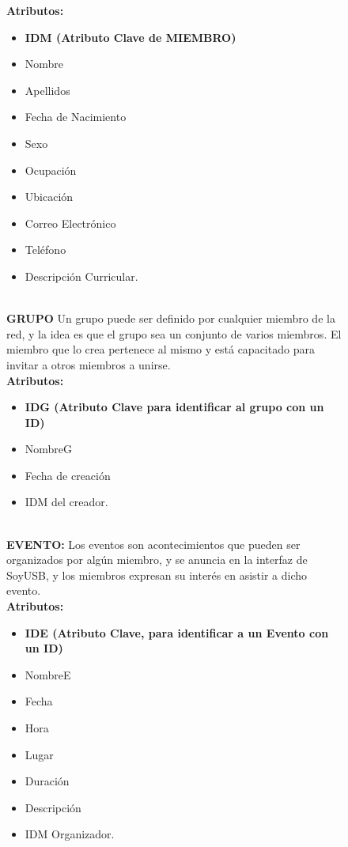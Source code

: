 \documentclass{article}
\begin{document}
\begin{figure}[h]
{\bf{Atributos:}}\\

\newline

\begin{itemize}
 \item {\bf{IDM (Atributo Clave de MIEMBRO)}}
\item Nombre
\item  Apellidos
\item Fecha de Nacimiento
\item Sexo
\item Ocupaci\'on
\item Ubicaci\'on
\item Correo Electr\'onico
\item Tel\'efono 
\item Descripci\'on Curricular. 

\end{itemize}\\

{\bf{GRUPO}} 
	Un grupo puede ser definido por cualquier miembro de la red, y la idea es que el grupo sea un conjunto de varios miembros. El miembro que lo crea pertenece al mismo y est\'a capacitado para invitar a otros miembros a unirse.\\

\newline
{\bf{Atributos:}} 
\newline
\begin{itemize}
\item {\bf{IDG (Atributo Clave para identificar al grupo con un ID)}}
\item NombreG
\item Fecha de creaci\'on
\item IDM del creador.\\
\end{itemize}\\

\newline
{\bf{EVENTO:}} Los eventos son acontecimientos que pueden ser organizados por alg\'un miembro, y se anuncia en la interfaz de SoyUSB, y los miembros expresan su inter\'es en asistir a dicho evento.\\
\newline
{\bf{Atributos:}}
\newline 
\begin{itemize}
\item{\bf{IDE (Atributo Clave, para identificar a un Evento con un ID)}}
\item NombreE
\item Fecha
\item Hora
\item Lugar
\item Duraci\'on
\item Descripci\'on
\item IDM Organizador.\\


\end{itemize}
\end{figure}
\end{document}
